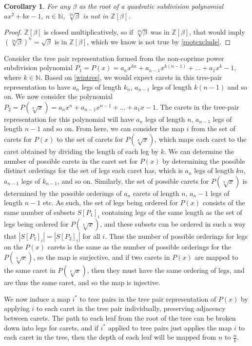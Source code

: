\documentclass[
11pt, %
english, %
singlespacing, %
parskip, %
headsepline, %
]{amsart} %
\newtheorem{corollary}[theorem]{Corollary}
\theoremstyle{definition}
\begin{document}
\begin{corollary} \label{rootcor}
For any $\beta$ as the root of a quadratic subdivision polynomial $ax^2+bx-1$, $n \in \mathbb{N}$, $\sqrt[2n]{\beta}$ is not in $\mathbb{Z}[\beta]$.
\end{corollary}
\begin{proof}
$\mathbb{Z}[\beta]$ is closed multiplicatively, so if $\sqrt[2n]{\beta}$ was in $\mathbb{Z}[\beta]$, that would imply $(\sqrt[2n]{\beta})^n = \sqrt{\beta}$ is in $\mathbb{Z}[\beta]$, which we know is not true by \ref{rootexclude}.
\end{proof}

Consider the tree pair representation formed from the non-coprime power subdivision polynomial $P_1=P(x)=a_n x^{kn} + a_{n-1} x^{k(n-1)} +...+ a_1 x^k -1$, where $k \in \mathbb{N}$. Based on \ref{wintree}, we would expect carets in this tree-pair representation to have $a_n$ legs of length $k_n$, $a_{n-1}$ legs of length $k(n-1)$ and so on. We now consider the polynomial $P_2=P(\sqrt[k]{x}) = a_n x^n + a_{n-1} x^{n-1} + ... + a_1 x -1$. The carets in the tree-pair representation for this polynomial will have $a_n$ legs of length $n$, $a_{n-1}$ legs of length $n-1$ and so on. From here, we can consider the map $i$ from the set of carets for $P(x)$ to the set of carets for $P(\sqrt[k]{x})$, which maps each caret to the caret obtained by dividing the length of each leg by $k$. We can determine the number of possible carets in the caret set for $P(x)$ by determining the possible distinct orderings for the set of legs each caret has, which is $a_n$ legs of length $kn$, $a_{n-1}$ legs of $k_{n-1}$, and so on. Similarly, the set of possible carets for $P(\sqrt[k]{x})$ is determined by the possible orderings of $a_n$ carets of length $n$, $a_n-1$ legs of length $n-1$ etc. As such, the set of legs being ordered for $P(x)$ consists of the same number of subsets $S[P_1]_i$ containing legs of the same length as the set of legs being ordered for $P(\sqrt[k]{x})$, and these subsets can be ordered in such a way that $|S[P_1]_i|=|S[P_2]_i|$ for all $i$. Thus the number of possible orderings for legs on the $P(x)$ carets is the same as the number of possible orderings for the $P(\sqrt[k]{x})$, so the map is surjective, and if two carets in $P(x)$ are mapped to the same caret in $P(\sqrt[k]{x})$, then they must have the same ordering of legs, and are thus the same caret, and so the map is injective. 
\par
We now induce a map $i^*$  to tree pairs in the tree pair representation of $P(x)$ by applying $i$ to each caret in the tree pair individually, preserving adjacency between carets. The path to each leaf from the root of the tree can be broken down into legs for carets, and if $i^*$ applied to tree pairs just applies the map $i$ to each caret in the tree, then the depth of each leaf will be mapped from $n$ to $\frac{n}{k}$.
\end{document}
